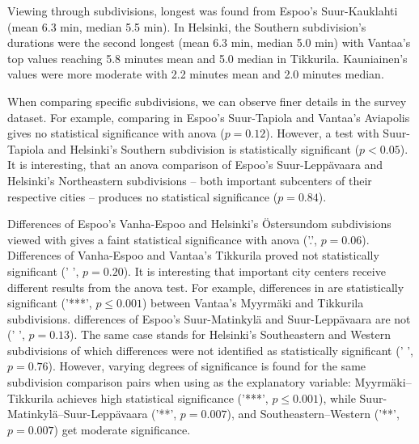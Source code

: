 Viewing  through subdivisions, longest  was found from Espoo's Suur-Kauklahti (mean 6.3 min, median 5.5 min). In Helsinki, the Southern subdivision's durations were the second longest (mean 6.3 min, median 5.0 min) with Vantaa's top values reaching 5.8 minutes mean and 5.0 median in Tikkurila. Kauniainen's  values were more moderate with 2.2 minutes mean and 2.0 minutes median.

When comparing specific subdivisions, we can observe finer details in the survey dataset. For example, comparing  in Espoo's Suur-Tapiola and Vantaa's Aviapolis gives no statistical significance with \acrshort{anova} ($p = 0.12$). However, a test with Suur-Tapiola and Helsinki's Southern subdivision is statistically significant ($p < 0.05$). It is interesting, that an \acrshort{anova}  comparison of Espoo's Suur-Leppävaara and Helsinki's Northeastern subdivisions -- both important subcenters of their respective cities -- produces no statistical significance ($p = 0.84$). 

Differences of Espoo's Vanha-Espoo and Helsinki's Östersundom subdivisions viewed with  gives a faint statistical significance with \acrshort{anova} ('.', $p = 0.06$). Differences of Vanha-Espoo and Vantaa's Tikkurila proved not statistically significant (' ', $p = 0.20$). It is interesting that important city centers receive different results from the \acrshort{anova} test. For example, differences in  are statistically significant (’***’, $p \leq 0.001$) between Vantaa's Myyrmäki and Tikkurila subdivisions.  differences of Espoo's Suur-Matinkylä and Suur-Leppävaara are not (' ', $p = 0.13$). The same case stands for Helsinki's Southeastern and Western subdivisions of which differences were not identified as statistically significant (' ', $p = 0.76$). However, varying degrees of significance is found for the same subdivision comparison pairs when using  as the explanatory variable: Myyrmäki--Tikkurila achieves high statistical significance (’***’, $p \leq 0.001$), while Suur-Matinkylä--Suur-Leppävaara ('**', $p = 0.007$), and Southeastern--Western ('**', $p = 0.007$) get moderate significance.

